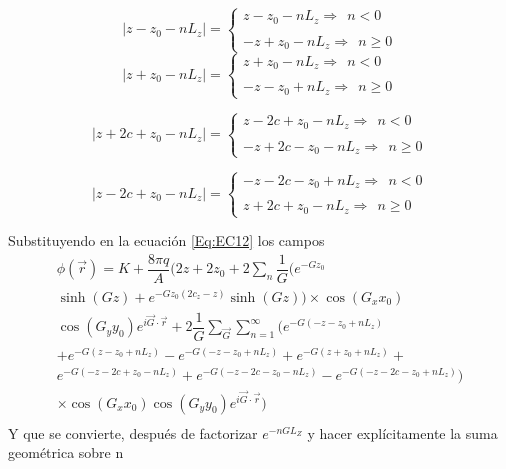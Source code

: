 \documentclass[a4paper,11pt,]{book}
\providecommand{\abs}[1]{\lvert#1\rvert}
\begin{document}
\begin{equation}
\abs{z-z_0-nL_z}= \left\lbrace
\begin{array}{ll}
z-z_0-nL_z \Rightarrow \ \ n<0 \\\\
-z+z_0-nL_z \Rightarrow \ \ n\geq 0
\end{array}
\right.
\end{equation}
\begin{equation}
\abs{z+z_0-nL_z}= \left\lbrace
\begin{array}{ll}
z+z_0-nL_z \Rightarrow \ \ n <0 \\\\
-z-z_0+nL_z \Rightarrow \ \ n\geq 0
\end{array}
\right.
\end{equation}

\begin{equation}
\abs{z+2c+z_0-nL_z}= \left\lbrace
\begin{array}{ll}
z-2c+z_0-nL_z \Rightarrow \ \ n <0 \\\\
-z+2c-z_0-nL_z \Rightarrow \ \ n\geq 0
\end{array}
\right.
\end{equation}

\begin{equation}
\abs{z-2c+z_0-nL_z}= \left\lbrace
\begin{array}{ll}
-z-2c-z_0+nL_z \Rightarrow \ \ n <0 \\\\
z+2c+z_0-nL_z \Rightarrow \ \ n\geq 0
\end{array}
\right.
\end{equation}

Substituyendo en la ecuación \ref{Eq:EC12} los campos 
\begin{eqnarray}
\nonumber\phi(\vec{r}) = K+\dfrac{8\pi q}{A} \bigg(  2z+2z_0  +2 \displaystyle\sum_{n}\dfrac{1}{G}\bigg(e^{-Gz_0} \\  \nonumber\sinh(Gz)+e^{-Gz_0(2c_z-z)} \sinh(Gz)\bigg) \times \cos(G_x x_0) \\  
\nonumber \cos(G_y y_0) e^{i \vec{G} \cdot \vec{r}} + 2\dfrac{1}{G}\displaystyle\sum_{\vec{G}}  \displaystyle\sum^{\infty}_{n=1}\bigg(   e^{-G(-z-z_0+nL_z)} \\  \nonumber +e^{-G(z-z_0+nL_z)}-e^{-G(-z-z_0+nL_z)}  +e^{-G(z+z_0+nL_z)}+ \\  \nonumber e^{-G(-z-2c+z_0-nL_z)}+ e^{-G(-z-2c-z_0-nL_z)}  - e^{-G(-z-2c-z_0+nL_z)} \bigg) \\  \nonumber \times \cos(G_x x_0) \cos(G_y y_0) e^{i \vec{G} \cdot \vec{r}} \bigg)\\
\end{eqnarray}
Y que se convierte, después de factorizar $ e ^ {- nGL_Z}$ y hacer explícitamente la suma geométrica sobre n
\end{document}
